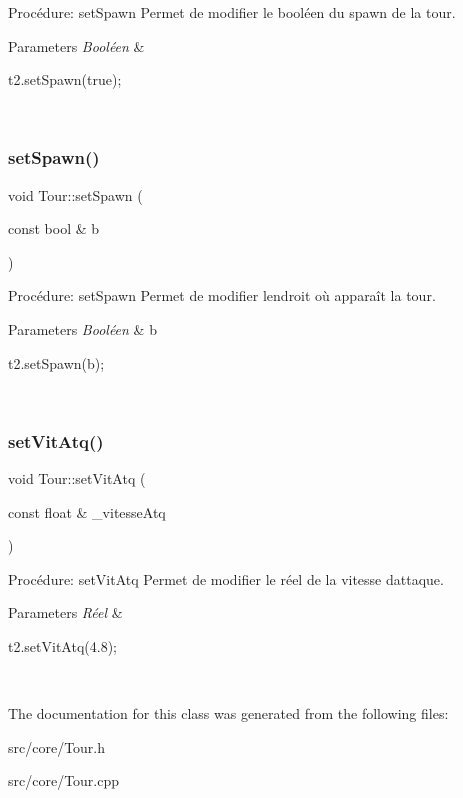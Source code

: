 Procédure\+: set\+Spawn Permet de modifier le booléen du spawn de la tour. 


\begin{DoxyParams}{Parameters}
{\em Booléen} & 
\begin{DoxyCode}
t2.setSpawn(\textcolor{keyword}{true});
\end{DoxyCode}
 \\
\hline
\end{DoxyParams}
\mbox{\label{classTour_a896b0ab5f8a022d7deb6d599de8d4642}} 
\subsubsection{\texorpdfstring{set\+Spawn()}{setSpawn()}\hspace{0.1cm}{\footnotesize\ttfamily [2/2]}}
{\footnotesize\ttfamily void Tour\+::set\+Spawn (\begin{DoxyParamCaption}\item[{const bool \&}]{b }\end{DoxyParamCaption})}



Procédure\+: set\+Spawn Permet de modifier l\textquotesingle{}endroit où apparaît la tour. 


\begin{DoxyParams}{Parameters}
{\em Booléen} & b 
\begin{DoxyCode}
t2.setSpawn(b);
\end{DoxyCode}
 \\
\hline
\end{DoxyParams}
\mbox{\label{classTour_a110c73fc4160189cdafbb700f3999a39}} 
\subsubsection{\texorpdfstring{set\+Vit\+Atq()}{setVitAtq()}}
{\footnotesize\ttfamily void Tour\+::set\+Vit\+Atq (\begin{DoxyParamCaption}\item[{const float \&}]{\+\_\+vitesse\+Atq }\end{DoxyParamCaption})}



Procédure\+: set\+Vit\+Atq Permet de modifier le réel de la vitesse d\textquotesingle{}attaque. 


\begin{DoxyParams}{Parameters}
{\em Réel} & 
\begin{DoxyCode}
t2.setVitAtq(4.8);
\end{DoxyCode}
 \\
\hline
\end{DoxyParams}


The documentation for this class was generated from the following files\+:\begin{DoxyCompactItemize}
\item 
src/core/Tour.\+h\item 
src/core/Tour.\+cpp\end{DoxyCompactItemize}
